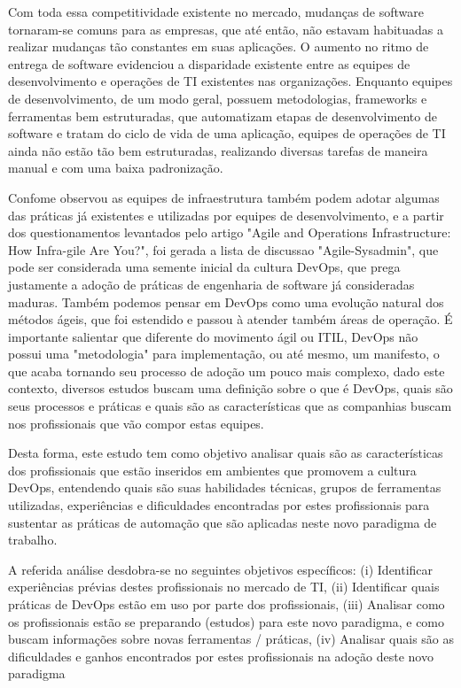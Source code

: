 \documentclass[twoside,english,brazilian]{UNISINOSartigo}
\begin{document}
Com toda essa competitividade existente no mercado, mudanças de software tornaram-se comuns para as empresas, que até então, não estavam habituadas a realizar mudanças tão constantes em suas aplicações. O aumento no ritmo de entrega de software evidenciou a disparidade existente entre as equipes de desenvolvimento e operações de TI existentes nas organizações. Enquanto equipes de desenvolvimento, de um modo geral, possuem metodologias, frameworks e ferramentas bem estruturadas, que automatizam etapas de desenvolvimento de software e tratam do ciclo de vida de uma aplicação, equipes de operações de TI ainda  não estão tão bem estruturadas, realizando diversas tarefas de maneira manual e com uma baixa padronização. 

Confome  observou as equipes de infraestrutura também podem adotar algumas das práticas já existentes e utilizadas por equipes de desenvolvimento, e a partir dos questionamentos levantados pelo artigo "Agile and Operations Infrastructure: How Infra-gile Are You?", foi gerada a lista de discussao "Agile-Sysadmin", que pode ser considerada uma semente inicial da cultura DevOps, que prega justamente a adoção de práticas de engenharia de software já consideradas maduras. Também podemos pensar em DevOps como uma evolução natural dos métodos ágeis, que foi estendido e passou à atender também áreas de operação. É importante salientar que diferente do movimento ágil ou ITIL, DevOps não possui uma "metodologia" para implementação, ou até mesmo, um manifesto, o que acaba tornando seu processo de adoção um pouco mais complexo, dado este contexto, diversos estudos buscam uma definição sobre o que é DevOps, quais são seus processos e práticas e quais são as características que as companhias buscam nos profissionais que vão compor estas equipes.

Desta forma, este estudo tem como objetivo analisar quais são as características dos profissionais que estão inseridos em ambientes que promovem a cultura DevOps, entendendo quais são suas habilidades técnicas, grupos de ferramentas utilizadas, experiências e dificuldades encontradas por estes profissionais para sustentar as práticas de automação que são aplicadas neste novo paradigma de trabalho.

A referida análise desdobra-se no seguintes objetivos específicos: (i) Identificar experiências prévias destes profissionais no mercado de TI, (ii) Identificar quais práticas de DevOps estão em uso por parte dos profissionais, (iii) Analisar como os profissionais estão se preparando (estudos) para este novo paradigma, e como buscam informações sobre novas ferramentas / práticas, (iv) Analisar quais são as dificuldades e ganhos encontrados por estes profissionais na adoção deste novo paradigma
\end{document}
